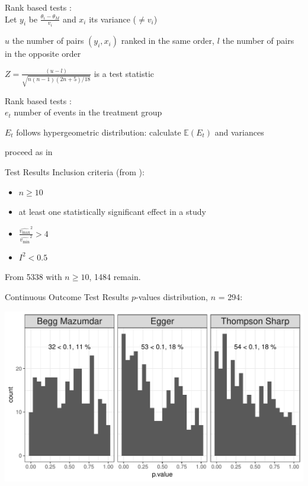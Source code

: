 \documentclass[english]{beamer}\usepackage[]{graphicx}\usepackage[]{color}
\makeatletter
\def\maxwidth{ %
  \ifdim\Gin@nat@width>\linewidth
    \linewidth
  \else
    \Gin@nat@width
  \fi
}
\newenvironment{knitrout}{}{} %
\makeatother
\begin{document}
\begin{frame}{Rank based tests}
\citet{begg.ties}: \\
Let $y_{i}$ be $\frac{\theta_i - \theta_M}{v_i}$ and $x_i$ its variance ($\neq v_i$)

$u$ the number of pairs $(y_{i}, x_{i})$ ranked in the same order, $l$
the number of pairs in the opposite order

$Z = \frac{(u - l)}{\sqrt{n(n-1)(2n + 5)/18}}$  is a test statistic
\end{frame}

\begin{frame}{Rank based tests}
\citet{Schwarzer}: \\
$e_t$ number of events in the treatment group

$E_t$ follows hypergeometric distribution: calculate $\mathbb{E}(E_{t})$ and variances

proceed as in \citet{begg.ties}
\end{frame}


\begin{frame}{Test Results}
Inclusion criteria (from \citet{Ioannidis2007}):
\begin{itemize}
\item $n \geq 10$
\item at least one statistically significant effect in a study
\item $\frac{\hat{v_{\textrm{max}}}^2}{\hat{v_{\textrm{min}}}^2} > 4$
\item $I^2 < 0.5$
\end{itemize}

From 5338 with $n \geq 10$, 1484 remain.
\end{frame}



\begin{frame}[fragile]{Continuous Outcome Test Results}
$p$-values distribution, $n$ = 294:

\vspace{-2mm}
\begin{knitrout}
\color{fgcolor}
\includegraphics[width=\maxwidth]{figure/unnamed-chunk-5-1} 

\end{knitrout}
\end{frame}
\end{document}
